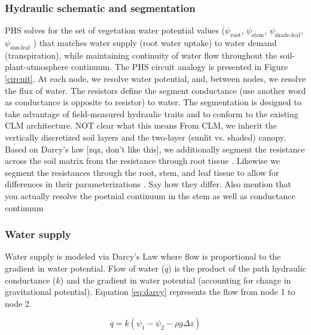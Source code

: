 \documentclass[draft,linenumbers]{agujournal}
\begin{document}
  \subsubsection{Hydraulic schematic and segmentation}
  PHS solves for the set of vegetation water potential values 
  ($\psi_{\text{root}}$, $\psi_{\text{stem}}$, $\psi_{\text{shade-leaf}}$, $\psi_{\text{sun-leaf}}$ ) 
  that matches water supply (root water uptake) to water demand (transpiration), 
  while maintaining continuity of water flow throughout the soil-plant-atmosphere continuum.
  The PHS circuit analogy is presented in Figure \ref{circuit}.
  At each node, we resolve water potential, and, between nodes, we resolve the flux of water.
  The resistors define the segment conductance (use another word as conductance is opposite to resistor) to water. 
  The segmentation is designed to take advantage of field-measured hydraulic traits 
  and to conform to the existing CLM architecture. NOT clear what this means
  From CLM, we inherit the vertically discretized soil layers and the two-layer (sunlit vs. shaded) canopy.
 Based on Darcy's law [zqz, don't like this], we additionally segment the resistance across the soil matrix from the 
  resistance through root tissue \citep{williams1996}. 
  Likewise we segment the resistances through the root, stem, and leaf tissue to allow for differences
  in their parameterizations \citep{simonin2015, sperry2015}. Say how they differ. Also mention that you actually resolve the poetnial continuum in the stem as well as conductance continuum

    \subsubsection{Water supply}
    \label{sect:supply}
    Water supply is modeled via Darcy's Law where flow is proportional to the gradient in water potential. 
    Flow of water ($q$) is the product of the path hydraulic conductance ($k$) and 
    the gradient in water potential (accounting for change in gravitational potential). 
    Equation \ref{eq:darcy} represents the flow from node 1 to node 2. 
    
     \begin{linenomath*}
     \begin{equation}
     \label{eq:darcy}
     q = k\left(\psi_1 - \psi_2 - \rho g \Delta z\right)
     \end{equation}
     \end{linenomath*}
    
\end{document}
